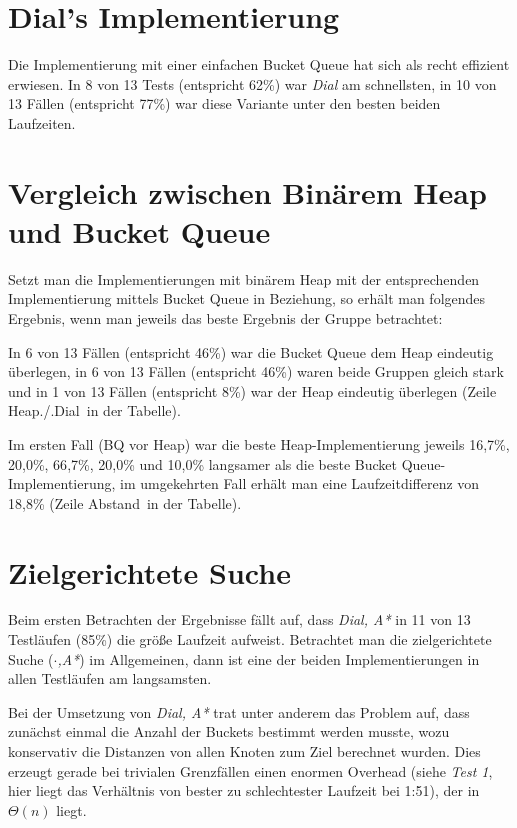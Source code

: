 \documentclass{scrartcl}
\begin{document}
\section{Dial's Implementierung}

Die Implementierung mit einer einfachen Bucket Queue hat sich als recht 
effizient erwiesen.
In 8 von 13 Tests (entspricht 62\%) war \emph{Dial} am schnellsten, in 
10 von 13 Fällen (entspricht 77\%) war diese Variante unter den besten
beiden Laufzeiten.

\section{Vergleich zwischen Binärem Heap und Bucket Queue}

Setzt man die Implementierungen mit binärem Heap mit der entsprechenden 
Implementierung mittels Bucket Queue  in Beziehung, so erhält man folgendes
Ergebnis, wenn man jeweils das beste Ergebnis der Gruppe betrachtet:

In 6 von 13 Fällen (entspricht 46\%) war die Bucket Queue dem Heap eindeutig überlegen,
in 6 von 13 Fällen (entspricht 46\%) waren beide Gruppen gleich stark und
in 1 von 13 Fällen (entspricht 8\%) war der Heap eindeutig überlegen
 (Zeile \glqq Heap./.Dial\grqq\ in der Tabelle).

Im ersten Fall (BQ vor Heap) war die beste Heap-Implementierung
jeweils 16{,}7\%, 20{,}0\%, 66{,}7\%, 20{,}0\% und 10{,}0\% langsamer als die beste
Bucket Queue-Implementierung, im umgekehrten Fall erhält 
man eine Laufzeitdifferenz von 18{,}8\% (Zeile \glqq Abstand\grqq\ in der Tabelle).

\section{Zielgerichtete Suche}

Beim ersten Betrachten der Ergebnisse fällt auf, dass \emph{Dial, A*} in
11 von 13 Testläufen (85\%) die größe Laufzeit aufweist.
Betrachtet man die zielgerichtete Suche (\emph{$\cdot$,A*}) im Allgemeinen,
dann ist eine der beiden Implementierungen in allen Testläufen am langsamsten.

Bei der Umsetzung von \emph{Dial, A*} trat unter anderem das Problem auf,
dass zunächst einmal die Anzahl der Buckets bestimmt werden musste, wozu
konservativ die Distanzen von allen Knoten zum Ziel berechnet wurden.
Dies erzeugt gerade bei trivialen Grenzfällen einen enormen Overhead
(siehe \emph{Test 1}, hier liegt das Verhältnis von bester zu 
schlechtester Laufzeit bei 1:51), der in $\Theta(n)$ liegt. 
\end{document}
